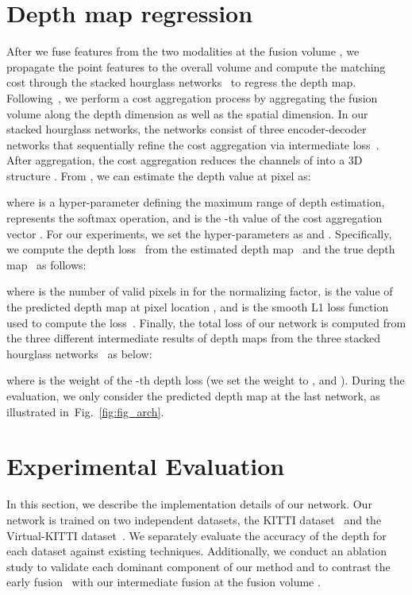 \documentclass[letterpaper, 10 pt, conference]{ieeeconf}
\newcommand{\Fref}[1]{Fig.~\textcolor{blue}{\ref{#1}}}
\begin{document}
\section{Depth map regression}
\label{sec:Depth regression}

After we fuse features from the two modalities at the fusion volume , we propagate the point features to the overall volume and compute the matching cost through the stacked hourglass networks~\cite{hourglass,psmnet} to regress the depth map. Following~\cite{psmnet}, we perform a cost aggregation process by aggregating the fusion volume along the depth dimension as well as the spatial dimension. In our stacked hourglass networks, the networks consist of three encoder-decoder networks that sequentially refine the cost aggregation via intermediate loss~\cite{psmnet,hourglass,ganet}. After aggregation, the cost aggregation reduces the channels of  into a 3D structure . From , we can estimate the depth value  at pixel  as: \vspace{-1mm}

where  is a hyper-parameter defining the maximum range of depth estimation,  represents the softmax operation, and  is the -th value of the cost aggregation vector . For our experiments, we set the hyper-parameters as  and . Specifically, we compute the depth loss~ from the estimated depth map~ and the true depth map~ as follows: \vspace{-1mm}

where  is the number of valid pixels in  for the normalizing factor,  is the value of the predicted depth map  at pixel location , and  is the smooth L1 loss function used to compute the loss~\cite{gcnet,psmnet}. Finally, the total loss  of our network is computed from the three different intermediate results of depth maps from the three stacked hourglass networks~\cite{psmnet,hourglass} as below:

where  is the weight of the -th depth loss  (we set the weight to ,  and ). During the evaluation, we only consider the predicted depth map at the last network, as illustrated in~\Fref{fig:fig_arch}. 





\section{Experimental Evaluation}
\label{sec:Experimental Evaluation}
In this section, we describe the implementation details of our network. Our network is trained on two independent datasets, the KITTI dataset~\cite{kitti-completion} and the Virtual-KITTI dataset~\cite{virtual-kitti}. We separately evaluate the accuracy of the depth for each dataset against existing techniques. Additionally, we conduct an ablation study to validate each dominant component of our method and to contrast the early fusion~\cite{stereolidar_norm_costV_ccvn} with our intermediate fusion at the fusion volume .
\end{document}
